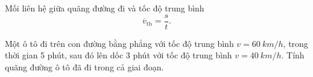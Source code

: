 \begin{dang}{Mối liên hệ giữa quãng đường đi và tốc độ trung bình}
$$\overline{v}_{\mathrm{tb}}=\dfrac{s}{t}.$$
\end{dang}
\begin{vd}
	Một ô tô đi trên con đường bằng phẳng với tốc độ trung bình $v = \SI{60}{km/h}$, trong thời gian 5 phút, sau đó lên dốc 3 phút với tốc độ trung bình $v = \SI{40}{km/h}$. Tính quãng đường ô tô đã đi trong cả giai đoạn.
\end{vd}

